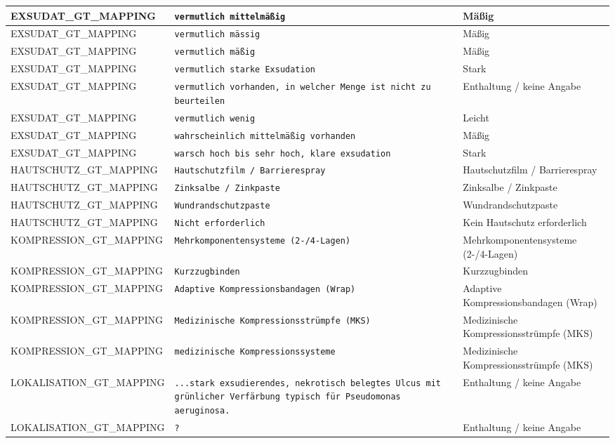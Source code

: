 \begin{longtable}{|p{3.5cm}|p{5cm}|p{6.5cm}|}
EXSUDAT\_GT\_MAPPING & \texttt{vermutlich mittelmäßig} & Mäßig \\ \hline
EXSUDAT\_GT\_MAPPING & \texttt{vermutlich mässig} & Mäßig \\ \hline
EXSUDAT\_GT\_MAPPING & \texttt{vermutlich mäßig} & Mäßig \\ \hline
EXSUDAT\_GT\_MAPPING & \texttt{vermutlich starke Exsudation} & Stark \\ \hline
EXSUDAT\_GT\_MAPPING & \texttt{vermutlich vorhanden, in welcher Menge ist nicht zu beurteilen} & Enthaltung / keine Angabe \\ \hline
EXSUDAT\_GT\_MAPPING & \texttt{vermutlich wenig} & Leicht \\ \hline
EXSUDAT\_GT\_MAPPING & \texttt{wahrscheinlich mittelmäßig vorhanden} & Mäßig \\ \hline
EXSUDAT\_GT\_MAPPING & \texttt{warsch hoch bis sehr hoch,  klare exsudation} & Stark \\ \hline
HAUTSCHUTZ\_GT\_MAPPING & \texttt{Hautschutzfilm / Barrierespray} & Hautschutzfilm / Barrierespray \\ \hline
HAUTSCHUTZ\_GT\_MAPPING & \texttt{Zinksalbe / Zinkpaste} & Zinksalbe / Zinkpaste \\ \hline
HAUTSCHUTZ\_GT\_MAPPING & \texttt{Wundrandschutzpaste} & Wundrandschutzpaste \\ \hline
HAUTSCHUTZ\_GT\_MAPPING & \texttt{Nicht erforderlich} & Kein Hautschutz erforderlich \\ \hline
KOMPRESSION\_GT\_MAPPING & \texttt{Mehrkomponentensysteme (2-/4-Lagen)} & Mehrkomponentensysteme (2-/4-Lagen) \\ \hline
KOMPRESSION\_GT\_MAPPING & \texttt{Kurzzugbinden} & Kurzzugbinden \\ \hline
KOMPRESSION\_GT\_MAPPING & \texttt{Adaptive Kompressionsbandagen (Wrap)} & Adaptive Kompressionsbandagen (Wrap) \\ \hline
KOMPRESSION\_GT\_MAPPING & \texttt{Medizinische Kompressionsstrümpfe (MKS)} & Medizinische Kompressionsstrümpfe (MKS) \\ \hline
KOMPRESSION\_GT\_MAPPING & \texttt{medizinische Kompressionssysteme} & Medizinische Kompressionsstrümpfe (MKS) \\ \hline
LOKALISATION\_GT\_MAPPING & \texttt{...stark exsudierendes, nekrotisch belegtes Ulcus mit grünlicher Verfärbung typisch für Pseudomonas aeruginosa.} & Enthaltung / keine Angabe \\ \hline
LOKALISATION\_GT\_MAPPING & \texttt{?} & Enthaltung / keine Angabe \\ \hline

\end{longtable}
